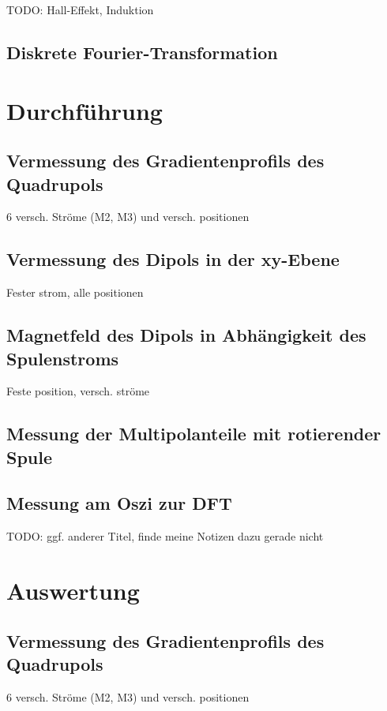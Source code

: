 \documentclass[bigchapter,colorback,accentcolor=tud4b,linedtoc,11pt]{tudreport}
\begin{document}
TODO: Hall-Effekt, Induktion

\section{Diskrete Fourier-Transformation}


\chapter{Durchführung}
\section{Vermessung des Gradientenprofils des Quadrupols}

6 versch. Ströme (M2, M3) und versch. positionen

\section{Vermessung des Dipols in der xy-Ebene}

Fester strom, alle positionen

\section{Magnetfeld des Dipols in Abhängigkeit des Spulenstroms}

Feste position, versch. ströme

\section{Messung der Multipolanteile mit rotierender Spule}

\section{Messung am Oszi zur DFT}

TODO: ggf. anderer Titel, finde meine Notizen dazu gerade nicht

\chapter{Auswertung}

\section{Vermessung des Gradientenprofils des Quadrupols}

6 versch. Ströme (M2, M3) und versch. positionen
\end{document}
